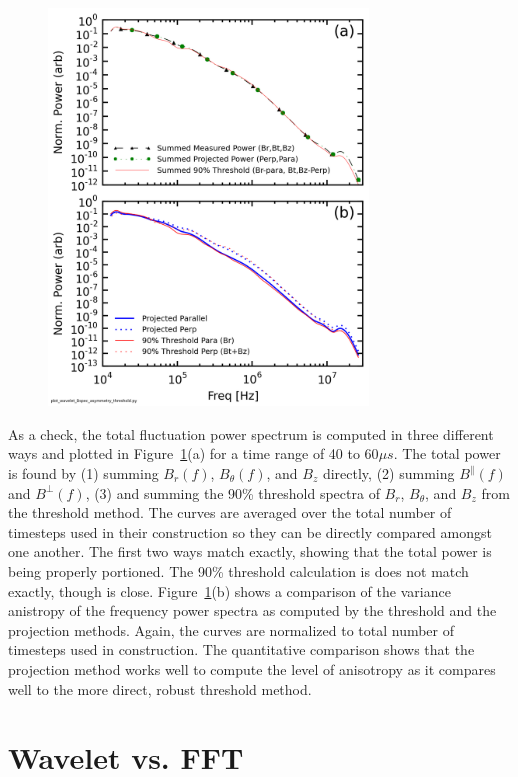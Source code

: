 \documentclass[aip,prl,amsmath,amssymb,reprint,superscriptaddress]{revtex4-1} %
\begin{document}
\begin{figure}[!htbp]
\centerline{
\includegraphics[width=8.5cm]{Bperppara_spectra_thresholdvsprojection40t60us}}
\caption{\label{fig:powercomparison}}
\end{figure}

As a check, the total fluctuation power spectrum is computed in three different ways and plotted in Figure~\ref{fig:powercomparison}(a) for a time range of 40 to 60$\mu s$. The total power is found by (1) summing $B_{r}(f)$, $B_{\theta}(f)$, and $B_{z}$ directly, (2) summing $B^{\parallel}(f)$ and $B^{\perp}(f)$, (3) and summing the 90\% threshold spectra of $B_{r}$, $B_{\theta}$, and $B_{z}$ from the threshold method. The curves are averaged over the total number of timesteps used in their construction so they can be directly compared amongst one another. The first two ways match exactly, showing that the total power is being properly portioned. The 90\% threshold calculation is does not match exactly, though is close. Figure~\ref{fig:powercomparison}(b) shows a comparison of the variance anistropy of the frequency power spectra as computed by the threshold and the projection methods. Again, the curves are normalized to total number of timesteps used in construction. The quantitative comparison shows that the projection method works well to compute the level of anisotropy as it compares well to the more direct, robust threshold method.

\section{Wavelet vs. FFT}
\end{document}
